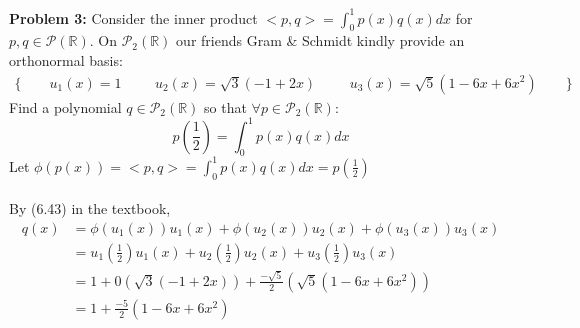 \documentclass[12pt]{article}
\begin{document}
\noindent \textbf{Problem 3: }Consider the inner product $<p,q> = \int_{0}^{1} p(x)q(x) dx$ for $p,q \in \mathcal{P}(\mathbb{R})$. On $\mathcal{P}_2(\mathbb{R})$ our friends Gram \& Schmidt kindly provide an orthonormal basis:
\begin{align*}
	\{ \qquad u_1(x) = 1 &&& u_2(x) = \sqrt{3}(-1 + 2x) &&& u_3(x) = \sqrt{5}(1 - 6x + 6x^2) \qquad \}
\end{align*}
Find a polynomial $q \in \mathcal{P}_2(\mathbb{R})$ so that $\forall p \in \mathcal{P}_2(\mathbb{R})$:
$$
p\left(\frac{1}{2}\right) = \int_{0}^{1} p(x)q(x) dx
$$
Let $\phi(p(x)) = <p,q> = \int_{0}^{1} p(x)q(x) dx = p\left(\frac{1}{2}\right)$ \\ \\
By (6.43) in the textbook, 
	\begin{align*}
		q(x) &= \phi(u_1(x))u_1(x) + \phi(u_2(x))u_2(x) + \phi(u_3(x))u_3(x) \\
		&= u_1\left(\frac{1}{2}\right)u_1(x) + u_2\left(\frac{1}{2}\right)u_2(x) +u_3\left(\frac{1}{2}\right)u_3(x) \\
		&= 1 + 0(\sqrt{3}(-1 + 2x)) + \frac{-\sqrt{5}}{2}(\sqrt{5}(1 - 6x + 6x^2)) \\
		&= 1 + \frac{-5}{2}(1 - 6x + 6x^2)
	\end{align*}
\end{document}
